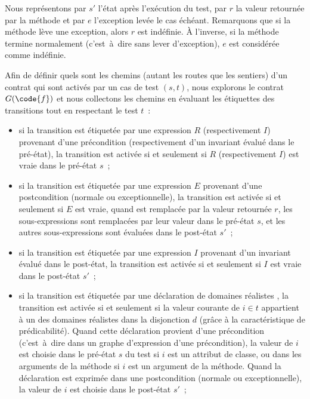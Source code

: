 Nous représentons par $s'$ l'état après l'exécution du test, par $r$ la valeur
retournée par la méthode  et par $e$ l'exception levée le cas échéant.
Remarquons que si la méthode lève une exception, alors $r$ est indéfinie. À
l'inverse, si la méthode termine normalement (c'est~à~dire sans lever
d'exception), $e$ est considérée comme indéfinie.

Afin de définir quels sont les chemins (autant les routes que les sentiers) d'un
contrat qui sont activés par un cas de test $(s, t)$, nous explorons le contrat
$G(\code{f})$ et nous collectons les chemins en évaluant les étiquettes des
transitions tout en respectant le test $t$~:
%
\begin{itemize}

\item si la transition est étiquetée par une expression $R$ (respectivement
$I$) provenant d'une précondition (respectivement d'un invariant évalué dans le
pré-état), la transition est activée si et seulement si $R$ (respectivement $I$)
est vraie dans le pré-état $s$~;

\item si la transition est étiquetée par une expression $E$ provenant d'une
postcondition (normale ou exceptionnelle), la transition est activée si et
seulement si $E$ est vraie, quand \aresult est remplacée par la valeur retournée
$r$, les sous-expressions \aold{\empty} sont remplacées par leur valeur dans le
pré-état $s$, et les autres sous-expressions sont évaluées dans le post-état
$s'$~;

\item si la transition est étiquetée par une expression $I$ provenant d'un
invariant évalué dans le post-état, la transition est activée si et seulement si
$I$ est vraie dans le post-état $s'$~;

\item si la transition est étiquetée par une déclaration de domaines réalistes
, la transition est activée si et seulement si la valeur courante
de $i \in t$ appartient à un des domaines réalistes dans la disjonction $d$
(grâce à la caractéristique de prédicabilité). Quand cette déclaration provient
d'une précondition (c'est~à~dire dans un graphe d'expression d'une
précondition), la valeur de $i$ est choisie dans le pré-état $s$ du test si $i$
est un attribut de classe, ou dans les arguments de la méthode si $i$ est un
argument de la méthode. Quand la déclaration est exprimée dans une postcondition
(normale ou exceptionnelle), la valeur de $i$ est choisie dans le post-état
$s'$~;


\end{itemize}
